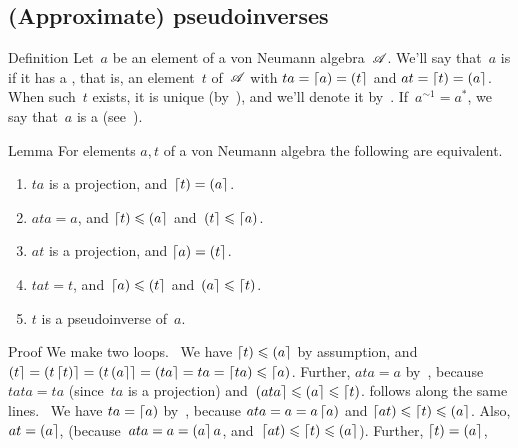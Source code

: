 \documentclass[a]{subfiles}
\begin{document}
\subsection{(Approximate) pseudoinverses}
\begin{parsec}%
\begin{point}{Definition}%
Let~$a$ be an element of a von Neumann algebra~$\mathscr{A}$.
We'll say that~$a$ is 
if it has a ,
that is,
an element~$t$ of~$\mathscr{A}$
with 
$ta=\left\lceil a\right)=\left(t\right\rceil$
and $at=\left\lceil t\right)=\left(a\right\rceil$.
When such~$t$ exists,
it is unique (by~),
and we'll denote it by~.
If~$a^{\sim1}=a^*$,
we say that~$a$ is a 
(see~).
\end{point}
\begin{point}{Lemma}%
For elements $a,t$ of a von Neumann algebra
the following are equivalent.
\begin{enumerate}
\item
\label{pseudoinverse-1}
$ta$ is a projection, and~$\left\lceil t\right)=\left(a\right\rceil$.
\item
\label{pseudoinverse-2}
$ata=a$, and $\left\lceil t\right)\leqslant \left(a\right\rceil$ and~$\left(t\right\rceil\leqslant \left\lceil a\right)$.
\item
\label{pseudoinverse-3}
$at$ is a projection, and $\left\lceil a\right)=\left(t\right\rceil$.
\item
\label{pseudoinverse-4}
$tat=t$, and~$\left\lceil a\right)\leqslant \left(t\right\rceil$ and~$\left(a\right\rceil\leqslant \left\lceil t\right)$.
\item
\label{pseudoinverse-5}
$t$ is a pseudoinverse of~$a$.
\end{enumerate}
\begin{point}{Proof}%
We make two loops.
\grayed{(\ref{pseudoinverse-1}$\Longrightarrow$\ref{pseudoinverse-2})}\ 
We have $\left\lceil t\right)\leqslant \left(a\right\rceil$ by assumption,
and $\left(t\right\rceil=\left(t\left\lceil t\right)\right\rceil
=\left(t\left(a\right\rceil\right\rceil
=\left(ta\right\rceil=ta=\left\lceil ta\right)\leqslant\left\lceil a\right)$.
Further, $ata=a$
by~,
because $tata=ta$ (since~$ta$ is a projection)
and~$\left(ata\right\rceil\leqslant \left(a\right\rceil\leqslant\left\lceil t\right)$.
\grayed{(\ref{pseudoinverse-3}$\Longrightarrow$\ref{pseudoinverse-4})} 
follows along the same lines.
\grayed{(\ref{pseudoinverse-2}$
	\Longrightarrow$%
\ref{pseudoinverse-5})}\ 
We have $ta=\left\lceil a\right)$ by~,
because $ata=a=a\left\lceil a\right)$
and $\left\lceil at\right)\leqslant\left\lceil t\right)\leqslant\left(a\right\rceil$.
Also, $at=\left(a\right\rceil$,
(because~$ata=a=\left(a\right\rceil a$,
and~$\left\lceil at\right)\leqslant\left\lceil t\right)\leqslant \left(a\right\rceil$).
Further, $\left\lceil t\right)=\left(a\right\rceil$,

\end{point}
\end{point}
\end{parsec}
\end{document}
